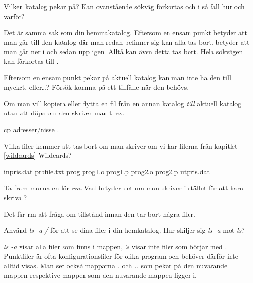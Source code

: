 \documentclass[a4paper,twocolumn]{book}
\begin{document}
\begin{exercise}
  Vilken katalog pekar  på? Kan
  ovanstående sökväg förkortas och i så fall hur och varför?
  \begin{answer}
    Det är samma sak som din hemmakatalog. Eftersom en ensam punkt
    betyder att man går till den katalog där man redan befinner sig
    kan alla  tas bort.  betyder att
    man går ner i  och sedan upp igen. Alltå kan även
    detta tas bort. Hela sökvägen kan förkortas till \ST{\~{}}.
  \end{answer}
\end{exercise}
\begin{exercise}
  Eftersom en ensam punkt pekar på aktuell katalog kan man inte ha den
  till mycket, eller\ldots? Försök komma på ett tillfälle när den behövs.
  \begin{answer}
    Om man vill kopiera eller flytta en fil från en annan katalog
    \emph{till} aktuell katalog utan att döpa om den skriver man t~ex:
    \begin{ttquote}
      cp adresser/nisse .
    \end{ttquote}
  \end{answer}
\end{exercise}

\begin{exercise}
  Vilka filer kommer att tas bort om man skriver  om vi har
  filerna från kapitlet \ref{wildcards} Wildcards?
  \begin{answer}
    inpris.dat profile.txt prog prog1.o prog1.p prog2.o prog2.p
    utpris.dat
  \end{answer}
\end{exercise}

\begin{exercise}
  Ta fram manualen för \emph{rm}. Vad betyder det om man skriver
   i stället för att bara skriva ?
  \begin{answer}
    Det får rm att fråga om tillstånd innan den tar bort några filer.
  \end{answer}
\end{exercise}

\begin{exercise}
  Använd \emph{ls -a \ST{\~}/} för att se dina filer i din hemkatalog.
  Hur skiljer sig \emph{ls -a} mot \emph{ls}?
	\begin{answer}
		\emph{ls -a} visar alla filer som finns i mappen, \emph{ls} visar
		inte filer som börjar med . Punktfiler är ofta konfigurationsfiler
		för olika program och behöver därför inte alltid visas. Man ser också mapparna
		\emph{.} och \emph{..} som pekar på den nuvarande mappen respektive mappen som den nuvarande
		mappen ligger i.
	\end{answer}
\end{exercise}
\end{document}
